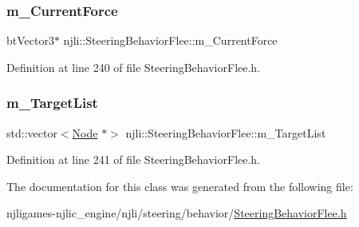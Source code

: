 \subsubsection{\texorpdfstring{m\+\_\+\+Current\+Force}{m\_CurrentForce}}
{\footnotesize\ttfamily bt\+Vector3$\ast$ njli\+::\+Steering\+Behavior\+Flee\+::m\+\_\+\+Current\+Force\hspace{0.3cm}{\ttfamily [private]}}



Definition at line 240 of file Steering\+Behavior\+Flee.\+h.

\mbox{\label{classnjli_1_1_steering_behavior_flee_afd424808278925f423752d3ce2e7a13e}} 
\subsubsection{\texorpdfstring{m\+\_\+\+Target\+List}{m\_TargetList}}
{\footnotesize\ttfamily std\+::vector$<$\mbox{\hyperlink{classnjli_1_1_node}{Node}} $\ast$$>$ njli\+::\+Steering\+Behavior\+Flee\+::m\+\_\+\+Target\+List\hspace{0.3cm}{\ttfamily [private]}}



Definition at line 241 of file Steering\+Behavior\+Flee.\+h.



The documentation for this class was generated from the following file\+:\begin{DoxyCompactItemize}
\item 
njligames-\/njlic\+\_\+engine/njli/steering/behavior/\mbox{\hyperlink{_steering_behavior_flee_8h}{Steering\+Behavior\+Flee.\+h}}\end{DoxyCompactItemize}

